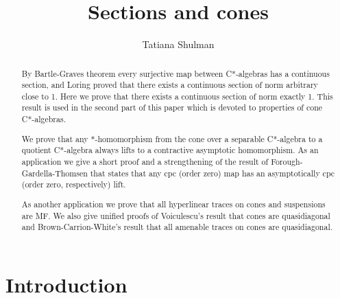 \documentclass{article}%
\title{Sections and cones}
\author{Tatiana Shulman}
\begin{document}




\maketitle

\begin{abstract} By Bartle-Graves theorem every surjective map between C*-algebras has a continuous section, and Loring proved that there exists a continuous section of norm arbitrary close to 1. Here we prove that there exists a continuous section of norm exactly 1. This result is used in the second part of this paper which is devoted to properties of cone C*-algebras.

  We prove that any $\ast$-homomorphism from the cone over a separable C*-algebra to a quotient C*-algebra always lifts to a contractive asymptotic homomorphism.
 As an application we give a short proof and a strengthening of the result of Forough-Gardella-Thomsen that states that any cpc (order zero) map  has an asymptotically cpc  (order zero, respectively) lift.

 As another application we prove that all hyperlinear traces on cones and suspensions are MF.
We also give unified proofs of Voiculescu's result that cones are quasidiagonal and Brown-Carrion-White's result  that all amenable traces on cones are quasidiagonal.
\end{abstract}





\tableofcontents

\bigskip

\bigskip

\section{Introduction}
\end{document}
